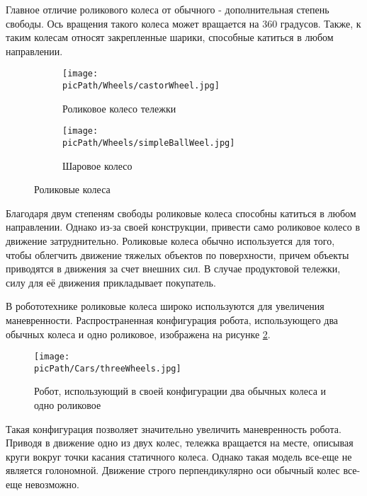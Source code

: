 \documentclass[oneside,final,14pt]{extreport}
\newcommand{\picPath}{img}
\begin{document}
Главное отличие роликового колеса от обычного - дополнительная степень свободы. Ось вращения такого колеса может вращается на $360$ градусов. Также, к таким колесам относят закрепленные шарики, способные катиться в любом направлении. 

\begin{figure}[H]
  \centering
  \begin{subfigure}[b]{0.4\linewidth}
   \texttt{[image: \\picPath/Wheels/castorWheel.jpg]}
    \caption{ Роликовое колесо тележки}
  \end{subfigure}
  \begin{subfigure}[b]{0.4\linewidth}
    \texttt{[image: \\picPath/Wheels/simpleBallWeel.jpg]}
    \caption{ Шаровое колесо }
  \end{subfigure}
  \caption{ Роликовые колеса}
  \label{Figure:CastorsWheels}
\end{figure}
Благодаря двум степеням свободы роликовые колеса способны катиться в любом направлении. Однако из-за своей конструкции, привести само роликовое колесо в движение затруднительно. Роликовые колеса обычно используется для того, чтобы облегчить движение тяжелых объектов по поверхности, причем объекты приводятся в движения за счет внешних сил. В случае продуктовой тележки, силу для её движения прикладывает покупатель.


В робототехнике роликовые колеса широко используются для увеличения маневренности. Распространенная конфигурация робота, использующего два обычных колеса и одно роликовое, изображена на рисунке \ref{Figure:threeWheelRobot}.
\begin{figure}[H]
\begin{center}
\texttt{[image: \\picPath/Cars/threeWheels.jpg]}
\end{center}
  \caption{ Робот, использующий в своей конфигурации два обычных колеса и одно роликовое}
  \label{Figure:threeWheelRobot}
\end{figure} 
Такая конфигурация позволяет значительно увеличить маневренность робота. Приводя в движение одно из двух колес, тележка вращается на месте, описывая круги вокруг точки касания статичного колеса. Однако такая модель все-еще не является голономной. Движение строго перпендикулярно оси обычный колес все-еще невозможно.
\end{document}
